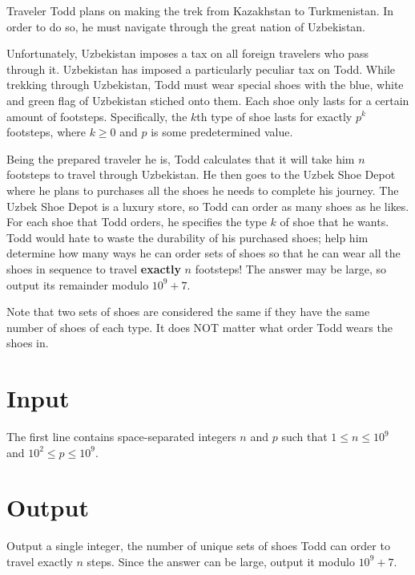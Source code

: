 
Traveler Todd plans on making the trek from Kazakhstan to Turkmenistan.
In order to do so, he must navigate through the great nation of Uzbekistan.

\medskip

Unfortunately, Uzbekistan imposes a tax on all foreign travelers who pass
through it. Uzbekistan has imposed a particularly peculiar tax on Todd.
While trekking through Uzbekistan, Todd must wear special shoes with the
blue, white and green flag of Uzbekistan stiched onto them. Each
shoe only lasts for a certain amount of footsteps. Specifically, the $k$th type of shoe
lasts for exactly $p^k$ footsteps, where $k \ge 0$ and $p$ is some predetermined value.

\medskip

Being the prepared traveler he is, Todd calculates that it will take him $n$ footsteps to travel through
Uzbekistan. He then goes to the Uzbek Shoe Depot where he plans to purchases all
the shoes he needs to complete his journey. The Uzbek Shoe Depot is a luxury store,
so Todd can order as many shoes as he likes.
For each shoe that Todd orders, he specifies the type $k$ of shoe that he wants.
Todd would hate to waste the durability of his purchased shoes;
help him determine how many ways he can order sets of shoes so
that he can wear all the shoes in sequence to travel \textbf{exactly} $n$
footsteps! The answer may be large, so output its remainder modulo $10^9 + 7$.

\medskip

Note that two sets of shoes are considered the same if they have the same
number of shoes of each type. It does NOT matter what order Todd wears the
shoes in.

\section*{Input}
The first line contains space-separated integers $n$ and $p$ such that
$1 \leq n \leq 10^9$ and $10^2 \leq p \leq 10^9$.

\section*{Output}
Output a single integer, the number of unique sets of shoes Todd can order
to travel exactly $n$ steps. Since the answer can be large, output it modulo $10^9 + 7$.
